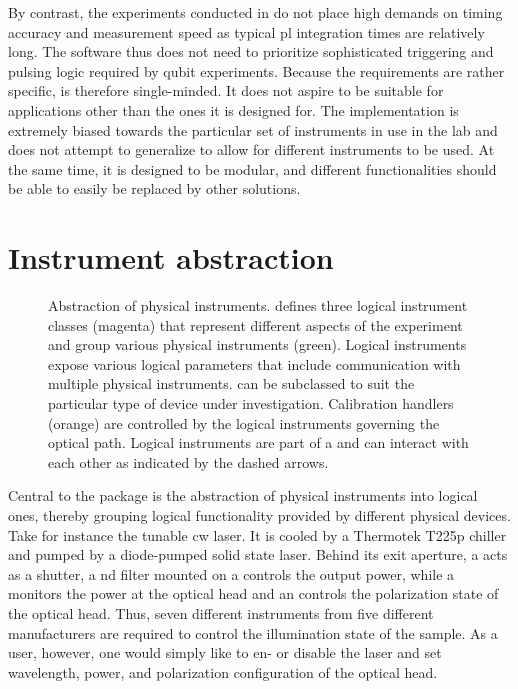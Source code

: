 By contrast, the experiments conducted in \thethesis do not place high demands on timing accuracy and measurement speed as typical \gls{pl} integration times are relatively long.
The software thus does not need to prioritize sophisticated triggering and pulsing logic required by qubit experiments.
Because the requirements are rather specific, \mjolnir is therefore single-minded.
It does not aspire to be suitable for applications other than the ones it is designed for.
The implementation is extremely biased towards the particular set of instruments in use in the lab and does not attempt to generalize to allow for different instruments to be used.
At the same time, it is designed to be modular, and different functionalities should be able to easily be replaced by other solutions.

\section{Instrument abstraction}\label{sec:exp:mjolnir:instruments}
\begin{figure}
    \centering
    
    \caption[]{
        Abstraction of physical instruments.
        \mjolnir defines three logical instrument classes (magenta) that represent different aspects of the experiment and group various physical instruments (green).
        Logical instruments expose various logical parameters that include communication with multiple physical instruments.
         can be subclassed to suit the particular type of device under investigation.
        Calibration handlers (orange) are controlled by the logical instruments governing the optical path.
        Logical instruments are part of a \qcodes {} and can interact with each other as indicated by the dashed arrows.
    }
    \label{fig:exp:mjolnir:layout}
\end{figure}

Central to the \mjolnir package is the abstraction of physical instruments into logical ones, thereby grouping logical functionality provided by different physical devices.
Take for instance the tunable \gls{cw} \tisalaser laser.
It is cooled by a Thermotek T225p chiller and pumped by a \pumplaser diode-pumped solid state laser.
Behind its exit aperture, a \thorlabsflipper acts as a shutter, a \gls{nd} filter mounted on a \thorlabsrotator controls the output power, while a \thorlabspowermeter monitors the power at the optical head and an \rotatorcontroller controls the polarization state of the optical head.
Thus, seven different instruments from five different manufacturers are required to control the illumination state of the sample.
As a user, however, one would simply like to en- or disable the laser and set wavelength, power, and polarization configuration of the optical head.

